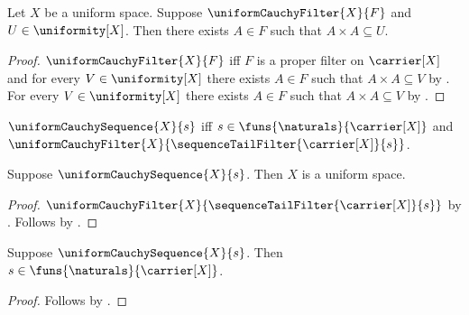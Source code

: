 \begin{proposition}\label{uniform_cauchy_filter_entourage_square}
    Let $X$ be a uniform space.
    Suppose $\uniformCauchyFilter{X}{F}$ and $U\in\uniformity[X]$.
    Then there exists $A\in F$ such that $A\times A\subseteq U$.
\end{proposition}
\begin{proof}
    $\uniformCauchyFilter{X}{F}$ iff
        $F$ is a proper filter on $\carrier[X]$ and
        for every $V\in\uniformity[X]$ there exists $A\in F$ such that
            $A\times A\subseteq V$ by
        .
    For every $V\in\uniformity[X]$ there exists $A\in F$ such that
        $A\times A\subseteq V$ by \auto.
\end{proof}

\begin{definition}\label{uniform_cauchy_sequence}
    $\uniformCauchySequence{X}{s}$ iff
        $s\in\funs{\naturals}{\carrier[X]}$ and
        $\uniformCauchyFilter{X}{\sequenceTailFilter{\carrier[X]}{s}}$.
\end{definition}

\begin{proposition}\label{uniform_cauchy_sequence_space}
    Suppose $\uniformCauchySequence{X}{s}$.
    Then $X$ is a uniform space.
\end{proposition}
\begin{proof}
    $\uniformCauchyFilter{X}{\sequenceTailFilter{\carrier[X]}{s}}$
        by .
    Follows by .
\end{proof}

\begin{proposition}\label{uniform_cauchy_sequence_sequence}
    Suppose $\uniformCauchySequence{X}{s}$.
    Then $s\in\funs{\naturals}{\carrier[X]}$.
\end{proposition}
\begin{proof}
    Follows by .
\end{proof}


